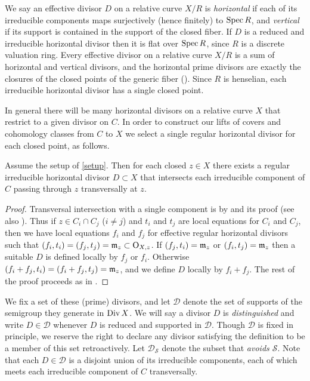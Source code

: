 \documentclass{amsart}
\theoremstyle{plain}
\theoremstyle{definition}
\theoremstyle{remark}
\numberwithin{equation}{section}%
\renewcommand{\O}{{\text{\rm O}}}
\renewcommand{\S}{{\mathcal S}}
\newcommand{\red}{{\text{\rm red}}}
\newcommand{\Div}{{\text{\rm Div}\,}}
\newcommand{\Spec}{{\text{\rm Spec}\,}}
\begin{document}
We say an effective divisor $D$ on a relative curve $X/R$ is {\it horizontal}
if each of its irreducible components maps surjectively (hence finitely) to $\Spec R$,
and {\it vertical} if its support is contained in the support of the closed fiber.
If $D$ is a reduced and irreducible horizontal divisor then it is flat over 
$\Spec R$, since $R$ is a discrete valuation ring.
Every effective divisor on a 
relative curve $X/R$ is a sum of horizontal and vertical divisors,
and the horizontal prime divisors are exactly the closures of the closed points of the generic fiber
(\cite[8.3.4(b)]{Liu}).
Since $R$ is henselian, each irreducible horizontal divisor has a single closed point.

\label{distinguished}
In general there will be many horizontal divisors on a relative curve $X$
that restrict to a given divisor on $C$.  
In order to construct our lifts of covers and cohomology classes
from $C$ to $X$ we select a single regular horizontal divisor for each closed point, as follows.

\Proposition\label{distingprop}
Assume the setup of \eqref{setup}.
Then for each closed $z\in X$ there exists a regular irreducible horizontal divisor $D\subset X$
that intersects each irreducible component of $C$ passing through $z$ transversally at $z$.
\rm

\begin{proof}
Transversal intersection with a single component is by
\cite[8.3.35(g)]{Liu} and its proof (see also \cite[21.9.12]{EGAIV:d}).
Thus if $z\in C_i\cap C_j$ ($i\neq j$) and $t_i$ and $t_j$ are local equations for $C_i$ and $C_j$,
then we have local equations $f_i$ and $f_j$ for effective regular horizontal divisors
such that $(f_i,t_i)=(f_j,t_j)=\frak m_z\subset\O_{X,z}$.
If $(f_j,t_i)=\frak m_z$ or $(f_i,t_j)=\frak m_z$ then a suitable $D$ is defined locally
by $f_j$  or $f_i$.  Otherwise $(f_i+f_j,t_i)=(f_i+f_j,t_j)=\frak m_z$,
and we define $D$ locally by $f_i+f_j$.
The rest of the proof proceeds as in \cite[3.3.35]{Liu}. 
\end{proof}\rm

We fix a set of these (prime) divisors, 
and let $\mathscr D$ denote the set of supports of the semigroup they generate in $\Div X$.
We will say a divisor $D$ is {\it distinguished}
and write $D\in\mathscr D$ whenever $D$ is reduced and supported in $\mathscr D$.
Though $\mathscr D$ is fixed in principle, we reserve the right to declare any
divisor satisfying the definition to be a member of this set retroactively.
Let $\mathscr D_\S$ denote the subset that {\it avoids $\S$}.
Note that each $D\in\mathscr D$ is a disjoint union of its irreducible components,
each of which meets each irreducible component of $C$
transversally.
\end{document}
